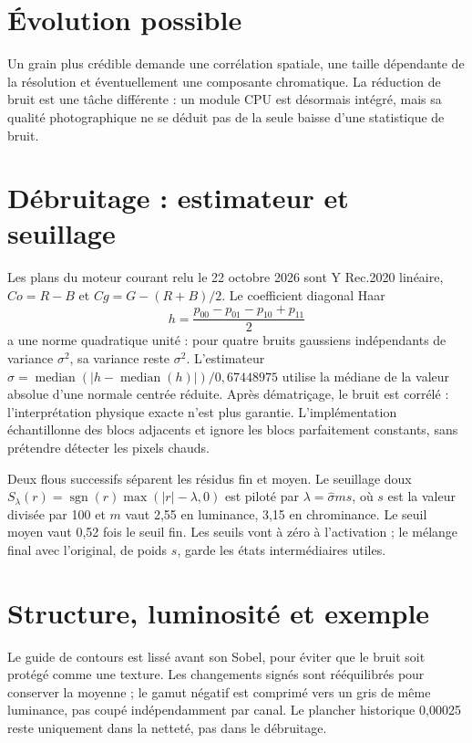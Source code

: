 \section{Évolution possible}
Un grain plus crédible demande une corrélation spatiale, une taille dépendante de la résolution et éventuellement une composante chromatique. La réduction de bruit est une tâche différente : un module CPU est désormais intégré, mais sa qualité photographique ne se déduit pas de la seule baisse d'une statistique de bruit.

\section{Débruitage : estimateur et seuillage}
Les plans du moteur courant relu le 22 octobre 2026 sont Y Rec.2020 linéaire, $Co=R-B$ et $Cg=G-(R+B)/2$.
Le coefficient diagonal Haar
\begin{equation}
h=\frac{p_{00}-p_{01}-p_{10}+p_{11}}{2}
\end{equation}
a une norme quadratique unité : pour quatre bruits gaussiens indépendants
de variance $\sigma^2$, sa variance reste $\sigma^2$. L'estimateur
$\widehat\sigma=\operatorname{median}(|h-\operatorname{median}(h)|)/0{,}67448975$
utilise la médiane de la valeur absolue d'une normale centrée réduite.
Après dématriçage, le bruit est corrélé : l'interprétation physique exacte
n'est plus garantie. L'implémentation échantillonne des blocs adjacents et
ignore les blocs parfaitement constants, sans prétendre détecter les pixels chauds.

Deux flous successifs séparent les résidus fin et moyen. Le seuillage doux
$S_\lambda(r)=\operatorname{sgn}(r)\max(|r|-\lambda,0)$ est piloté par
$\lambda=\widehat\sigma ms$, où $s$ est la valeur divisée par 100 et
$m$ vaut 2,55 en luminance, 3,15 en chrominance. Le seuil moyen vaut
0,52 fois le seuil fin. Les seuils vont à zéro à l'activation ; le mélange
final avec l'original, de poids $s$, garde les états intermédiaires utiles.

\section{Structure, luminosité et exemple}
Le guide de contours est lissé avant son Sobel, pour éviter que le bruit
soit protégé comme une texture. Les changements signés sont rééquilibrés
pour conserver la moyenne ; le gamut négatif est comprimé vers un gris
de même luminance, pas coupé indépendamment par canal. Le plancher
historique 0,00025 reste uniquement dans la netteté, pas dans le débruitage.

